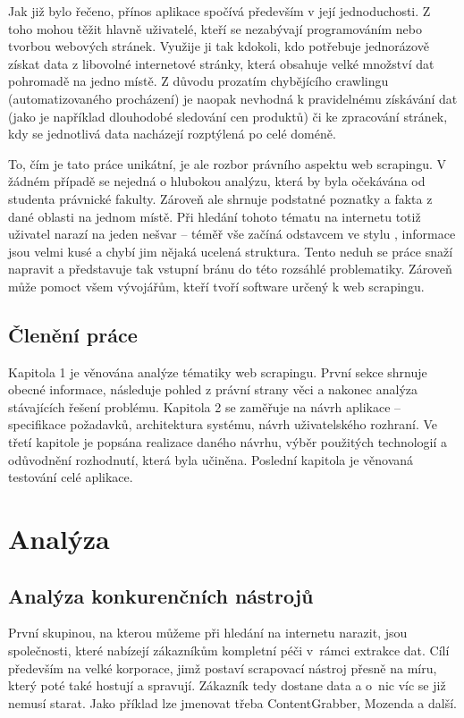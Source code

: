 \documentclass[thesis=B,czech]{FITthesis2}[2012/06/26]
\begin{document}
\begin{introduction}
		Jak již bylo řečeno, přínos aplikace spočívá především v její jednoduchosti. Z toho mohou těžit hlavně uživatelé, kteří se nezabývají programováním nebo tvorbou webových stránek. Využije ji tak kdokoli, kdo potřebuje jednorázově získat data z libovolné internetové stránky, která obsahuje velké množství dat pohromadě na jedno místě. Z důvodu prozatím chybějícího crawlingu (automatizovaného procházení) je naopak nevhodná k pravidelnému získávání dat (jako je například dlouhodobé sledování cen produktů) či ke zpracování stránek, kdy se jednotlivá data nacházejí rozptýlená po celé doméně.
		
		To, čím je tato práce unikátní, je ale rozbor právního aspektu web scrapingu. V žádném případě se nejedná o hlubokou analýzu, která by byla očekávána od studenta právnické fakulty. Zároveň ale shrnuje podstatné poznatky a fakta z dané oblasti na jednom místě. Při hledání tohoto tématu na internetu totiž uživatel narazí na jeden nešvar -- téměř vše začíná odstavcem ve stylu , informace jsou velmi kusé a chybí jim nějaká ucelená struktura. Tento neduh se práce snaží napravit a představuje tak vstupní bránu do této rozsáhlé problematiky. Zároveň může pomoct všem vývojářům, kteří tvoří software určený k web scrapingu.
		
		\section*{Členění práce}
		Kapitola 1 je věnována analýze tématiky web scrapingu. První sekce shrnuje obecné informace, následuje pohled z právní strany věci a nakonec analýza stávajících řešení problému. Kapitola 2 se zaměřuje na návrh aplikace -- specifikace požadavků, architektura systému, návrh uživatelského rozhraní. Ve třetí kapitole je popsána realizace daného návrhu, výběr použitých technologií a odůvodnění rozhodnutí, která byla učiněna. Poslední kapitola je věnovaná testování celé aplikace.
	\end{introduction}
	
	
	
	
	\chapter{Analýza}
	
	\section{Analýza konkurenčních nástrojů}
	První skupinou, na kterou můžeme při hledání na internetu narazit, jsou společnosti, které nabízejí zákazníkům kompletní péči v~rámci extrakce dat. Cílí především na velké korporace, jimž postaví scrapovací nástroj přesně na míru, který poté také hostují a spravují. Zákazník tedy dostane data a o~nic víc se již nemusí starat. Jako příklad lze jmenovat třeba ContentGrabber, Mozenda a další.
	
\end{document}
